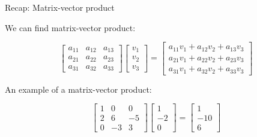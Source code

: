 \documentclass{beamer}
\begin{document}
\begin{frame}{Recap: Matrix-vector product}
	\begin{flushleft}
		
		We can find matrix-vector product:
		
		\begin{equation}
			\begin{bmatrix}
				a_{11} & a_{12} & a_{13} \\
				a_{21} & a_{22} & a_{23} \\
				a_{31} & a_{32} & a_{33}
			\end{bmatrix}
			\begin{bmatrix}
				v_{1}  \\
				v_{2}  \\
				v_{3}
			\end{bmatrix} =
			\begin{bmatrix}
				a_{11} v_{1} + a_{12} v_{2} + a_{13}v_{3} \\
				a_{21} v_{1} + a_{22} v_{2} + a_{23}v_{3} \\
				a_{31} v_{1} + a_{32} v_{2} + a_{33}v_{3}
			\end{bmatrix}
		\end{equation}
	
		\bigskip
		
		An example of a matrix-vector product:
		
		\begin{equation}
			\begin{bmatrix}
				1 & 0 & 0 \\
				2 & 6 & -5 \\
				0 & -3 & 3
			\end{bmatrix}
			\begin{bmatrix}
				1  \\
				-2  \\
				0
			\end{bmatrix} =
			\begin{bmatrix}
				1 \\
				-10 \\
				6
			\end{bmatrix}
		\end{equation}
		
	\end{flushleft}
\end{frame}
\end{document}
